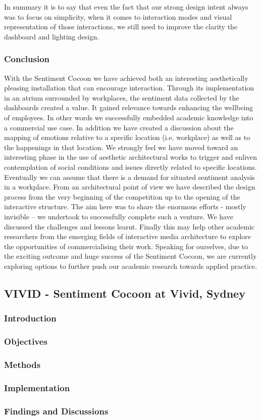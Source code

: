 In summary it is to say that even the fact that our strong design intent always was to focus on simplicity, when it comes to interaction modes and visual representation of those interactions, we still need to improve the clarity the dashboard and lighting design.


\subsubsection{Conclusion}

With the Sentiment Cocoon we have achieved both an interesting aesthetically pleasing installation that can encourage interaction. Through its implementation in an atrium surrounded by workplaces, the sentiment data collected by the dashboards created a value. It gained relevance towards enhancing the wellbeing of employees. In other words we successfully embedded academic knowledge into a commercial use case. In addition we have created a discussion about the mapping of emotions relative to a specific location (i.e. workplace) as well as to the happenings in that location. We strongly feel we have moved toward an interesting phase in the use of aesthetic architectural works to trigger and enliven contemplation of social conditions and issues directly related to specific locations. Eventually we can assume that there is a demand for situated sentiment analysis in a workplace.
From an architectural point of view we have described the design process from the very beginning of the competition up to the opening of the interactive structure. The aim here was to share the enormous efforts - mostly invisible – we undertook to successfully complete such a venture. We have discussed the challenges and lessons learnt. Finally this may help other academic researchers from the emerging fields of interactive media architecture to explore the opportunities of commercialising their work.
Speaking for ourselves, due to the exciting outcome and huge success of the Sentiment Cocoon, we are currently exploring options to further push our academic research towards applied practice.

\subsection{VIVID - Sentiment Cocoon at Vivid, Sydney}

\subsubsection {Introduction} 
\subsubsection {Objectives} 
\subsubsection {Methods}
\subsubsection {Implementation}
\subsubsection {Findings and Discussions}




